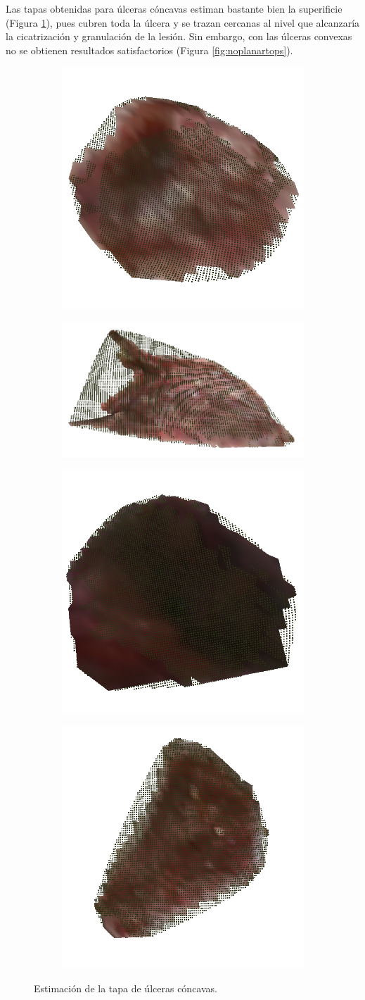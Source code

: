 Las tapas obtenidas para úlceras cóncavas estiman bastante bien la superificie (Figura \ref{fig:planartops}), pues cubren toda la úlcera y se trazan cercanas al nivel que alcanzaría la cicatrización y granulación de la lesión. Sin embargo, con las úlceras convexas no se obtienen resultados satisfactorios (Figura \ref{fig:noplanartops}). 

\begin{figure}[ht]
	\centering
	\begin{subfigure}
		\centering
		\includegraphics[width=.2\linewidth]{./Graphics/planar01.png}
	\end{subfigure}
	\begin{subfigure}
		\centering
		\includegraphics[width=.2\linewidth]{./Graphics/planar03.png}
	\end{subfigure}
	\begin{subfigure}
		\centering
		\includegraphics[width=.2\linewidth]{./Graphics/planar02.png}
	\end{subfigure}
	\begin{subfigure}
		\centering
		\includegraphics[width=.2\linewidth]{./Graphics/planar04.png}
	\end{subfigure}
	\caption{Estimación de la tapa de úlceras cóncavas.}
	\label{fig:planartops}
\end{figure} 

